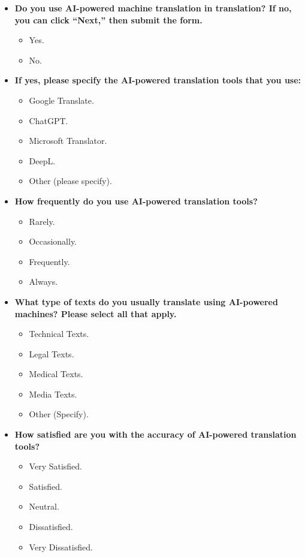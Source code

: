 \documentclass[english]{textolivre}
\begin{document}
\begin{itemize}

\item \textbf{Do you use AI-powered machine translation in translation? If no, you can click ``Next,'' then submit the form.}
\begin{itemize}
    \item Yes.
    \item No.
\end{itemize}

\item \textbf{If yes, please specify the AI-powered translation tools that you use:}
\begin{itemize}
    \item Google Translate.
    \item ChatGPT.
    \item Microsoft Translator.
    \item DeepL.
    \item Other (please specify).
\end{itemize}

\item \textbf{How frequently do you use AI-powered translation tools?}
\begin{itemize}
    \item Rarely.
    \item Occasionally.
    \item Frequently.
    \item Always.
\end{itemize}

\item \textbf{What type of texts do you usually translate using AI-powered machines? Please select all that apply.}
\begin{itemize}
    \item Technical Texts.
    \item Legal Texts.
    \item Medical Texts.
    \item Media Texts.
    \item Other (Specify).
\end{itemize}

\item \textbf{How satisfied are you with the accuracy of AI-powered translation tools?}
\begin{itemize}
    \item Very Satisfied.
    \item Satisfied.
    \item Neutral.
    \item Dissatisfied.
    \item Very Dissatisfied.
\end{itemize}


\end{itemize}
\end{document}

